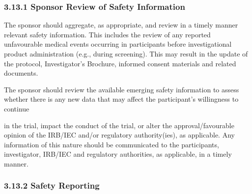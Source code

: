 \documentclass[11pt]{article}
\begin{document}
\subsubsection{3.13.1 Sponsor Review of Safety Information}

The sponsor should aggregate, as appropriate, and review in a timely manner relevant safety information. This includes the review of any reported unfavourable medical events occurring in participants before investigational product administration (e.g., during screening). This may result in the update of the protocol, Investigator's Brochure, informed consent materials and related documents.


The sponsor should review the available emerging safety information to assess whether there is any new data that may affect the participant's willingness to continue


in the trial, impact the conduct of the trial, or alter the approval/favourable opinion of the IRB/IEC and/or regulatory authority(ies), as applicable. Any information of this nature should be communicated to the participants, investigator, IRB/IEC and regulatory authorities, as applicable, in a timely manner.


\subsubsection{3.13.2 Safety Reporting}
\end{document}

